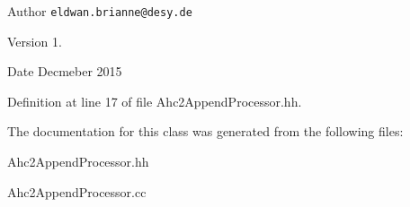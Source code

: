 \begin{DoxyAuthor}{Author}
{\tt eldwan.\-brianne@desy.\-de} 
\end{DoxyAuthor}
\begin{DoxyVersion}{Version}
1. 
\end{DoxyVersion}
\begin{DoxyDate}{Date}
Decmeber 2015 
\end{DoxyDate}


Definition at line 17 of file Ahc2\-Append\-Processor.\-hh.



The documentation for this class was generated from the following files\-:\begin{DoxyCompactItemize}
\item 
Ahc2\-Append\-Processor.\-hh\item 
Ahc2\-Append\-Processor.\-cc\end{DoxyCompactItemize}
